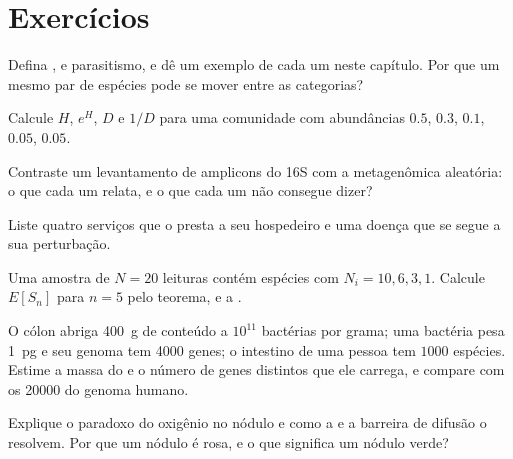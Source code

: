 \section{Exercícios}

\begin{exercise}[$\star$]\label{exo:b3:microbiomes:1}
Defina ,  e parasitismo, e dê um exemplo de cada
um neste capítulo. Por que um mesmo par de espécies pode se mover entre
as categorias?
\end{exercise}

\begin{exercise}[$\star$]\label{exo:b3:microbiomes:2}
Calcule $H$, $e^{H}$, $D$ e $1/D$ para uma comunidade com abundâncias
$0.5$, $0.3$, $0.1$, $0.05$, $0.05$.
\end{exercise}

\begin{exercise}[$\star$]\label{exo:b3:microbiomes:3}
Contraste um levantamento de amplicons do 16S com a metagenômica
aleatória: o que cada um relata, e o que cada um não consegue dizer?
\end{exercise}

\begin{exercise}[$\star$]\label{exo:b3:microbiomes:4}
Liste quatro serviços que o  presta a seu
hospedeiro e uma doença que se segue a sua perturbação.
\end{exercise}

\begin{exercise}[$\star\star$]\label{exo:b3:microbiomes:5}
Uma amostra de $N = 20$ leituras contém espécies com
$N_{i} = 10, 6, 3, 1$. Calcule $E[S_{n}]$ para $n = 5$ pelo teorema, e
a .
\end{exercise}

\begin{exercise}[$\star\star$]\label{exo:b3:microbiomes:6}
O cólon abriga \qty{400}{g} de conteúdo a $10^{11}$ bactérias por
grama; uma bactéria pesa \qty{1}{pg} e seu genoma tem \num{4000} genes;
o intestino de uma pessoa tem $1000$ espécies. Estime a massa do
 e o número de genes distintos que ele carrega, e compare com
os \num{20000} do genoma humano.
\end{exercise}

\begin{exercise}[$\star\star$]\label{exo:b3:microbiomes:7}
Explique o paradoxo do oxigênio no nódulo e como a  e a
barreira de difusão o resolvem. Por que um nódulo é rosa, e o que
significa um nódulo verde?
\end{exercise}

